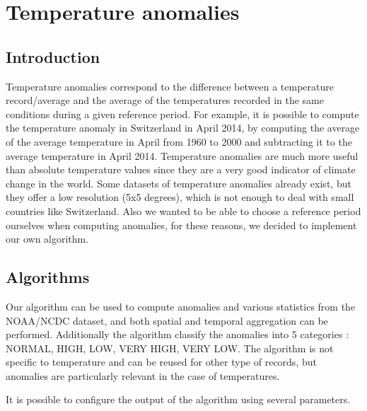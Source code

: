 \documentclass[12pt]{article}
\begin{document}
\section{Temperature anomalies}

\subsection{Introduction}

Temperature anomalies correspond to the difference between a temperature record/average
and the average of the temperatures recorded in the same conditions during a given reference period.
For example, it is possible to compute the temperature anomaly in Switzerland in April 2014, by
computing the average of the average temperature in April from 1960 to 2000 and subtracting it to the
average temperature in April 2014. Temperature anomalies are much more useful than absolute temperature values since
 they are a very good indicator of climate change in the world.
Some datasets of temperature anomalies already exist, but they offer a
low resolution (5x5 degrees), which is not enough to deal with small countries like Switzerland.
Also we wanted to be able to choose a reference period ourselves when computing anomalies, for these reasons,
we decided to implement our own algorithm.

\subsection{Algorithms}

Our algorithm can be used to compute anomalies and various statistics from the NOAA/NCDC dataset, and both spatial and temporal aggregation
can be performed. Additionally the algorithm classify the anomalies into 5 categories : NORMAL, HIGH, LOW, VERY HIGH, VERY LOW.
The algorithm is not specific to temperature and can be reused for other type of records, but anomalies are particularly relevant in the case of temperatures.

It is possible to configure the output of the algorithm using several parameters.
\end{document}
